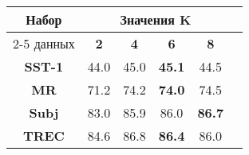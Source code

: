 \begin{minipage}{\linewidth}
\begin{center}
 \label{tab:title} 
\begin{tabular}{|c|c|c|c|c|c|}
\hline
\multirow{2}{*}{Набор}   &  \multicolumn{4}{c|}{Значения K} \\ \cline{2-5} 
     данных              &  \textbf{2}& \textbf{4}   & \textbf{6} & \textbf{8} \\ \hline
\textbf{SST-1}           & 44.0       & 45.0 &   \textbf{45.1}     & 44.5     \\ \hline
\textbf{MR}              & 71.2       & 74.2  &  \textbf{74.0}     & 74.5     \\ \hline
\textbf{Subj}            & 83.0       & 85.9  &  86.0              & \textbf{86.7} \\ \hline
\textbf{TREC}            & 84.6       & 86.8  &  \textbf{86.4}     & 86.0     \\ \hline
\end{tabular}
\end{center}
\end{minipage}
\vspace{5mm}